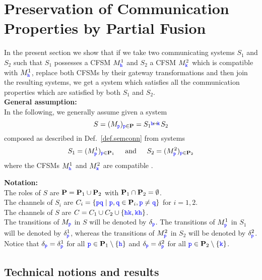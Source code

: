 


\section{Preservation of Communication Properties by Partial Fusion}
\label{sect:safetypreservation}


In the present section we show that if we take two communicating systems
$S_1$ and $S_2$ such that $S_1$ possesses a CFSM $M^1_\HH$ and $S_2$ a CFSM $M^2_\KK$ which is compatible with $M^1_\HH$, replace both CFSMs by their gateway transformations and then join the resulting systems, we get a system which satisfies all the communication properties which are satisfied by both $S_1$ and $S_2$.\\


\noindent
\textbf{General assumption:}\\ 
In the following, we generally assume given a
system  
$$S= (M_\ttp)_{\ttp\in\roles} ={S_{1}}\connect{\HH}{\KK} {S_{2}}$$  
composed
as described in Def.~\ref{def.semconn}
from systems 
$$S_1= (M^1_\ttp)_{\ttp\in\roles_1}  \hspace{4mm} \text{ and } \hspace{4mm} S_2= (M^2_\ttp)_{\ttp\in\roles_2}$$ where the CFSMs $M^1_\HH$ and $M^2_\KK$ are compatible . 

\vspace{2mm}
\noindent
\textbf{Notation:} \\
The roles of $S$ are $\roles=\roles_1\cup\roles_2$ with  $\roles_1\cap\roles_2=\emptyset$.\\
The channels of $S_i$ are  $C_i=\Set{\ttp\ttq \mid \ttp,\ttq\in \roles_i, \ttp\neq\ttq}$ for $i=1,2$.\\
The channels of $S$ are 
$C=C_1\cup C_2\cup\Set{\HH\KK,\KK\HH}$.\\
The transitions of $M_\ttp$ in $S$ will be denoted by $\delta_\ttp$.
The transitions of $M^1_\ttp$ in $S_1$ will be denoted by $\delta^1_\ttp$, whereas the 
transitions of $M^2_\ttp$ in $S_2$ will be denoted by $\delta^2_\ttp$.
Notice that $\delta_\ttp = \delta^1_\ttp$ for all $\ttp\in\roles_1\setminus\Set{\HH}$
and $\delta_\ttp = \delta^2_\ttp$ for all $\ttp\in\roles_2\setminus\Set{\KK}$.



\subsection{Technical notions and results}

